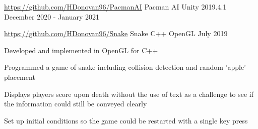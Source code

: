 

\begin{cventries}
    \cventry
    {\href{https://github.com/HDonovan96/PacmanAI}{https://github.com/HDonovan96/PacmanAI}}
    {Pacman AI}
    {Unity 2019.4.1}
    {December 2020 - January 2021}
    {
        \begin{cvitems}
            \item 
        \end{cvitems}
    }

    \cventry
    {\href{https://github.com/HDonovan96/Snake}{https://github.com/HDonovan96/Snake}}
    {Snake}
    {C++ OpenGL}
    {July 2019}
    {
        \begin{cvitems}
            \item Developed and implemented in OpenGL for C++
            \item Programmed a game of snake including collision detection and random 'apple' placement
            \item Displays players score upon death without the use of text as a challenge to see if the information could still be conveyed clearly
            \item Set up initial conditions so the game could be restarted with a single key press
        \end{cvitems}  
    }

    
\end{cventries}